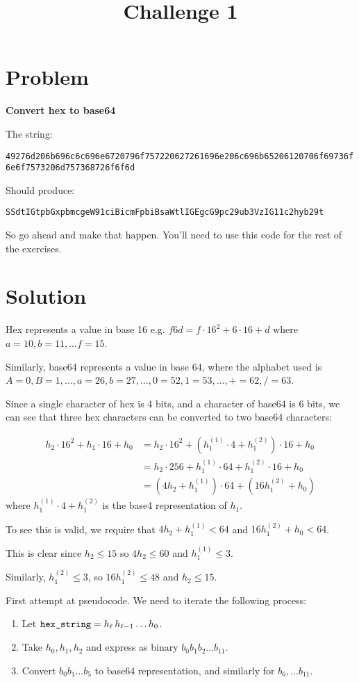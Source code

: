 \documentclass[a4paper,10pt]{article}
\begin{document}
\title{Challenge 1}
\date{}

\maketitle

\section{Problem} %
\label{sec:problem}

{\bf Convert hex to base64}

The string:

\verb+49276d206b696c6c696e6720796f757220627261696e206c696b65206120706f69736f6e6f7573206d757368726f6f6d+

Should produce:

\verb+SSdtIGtpbGxpbmcgeW91ciBicmFpbiBsaWtlIGEgcG9pc29ub3VzIG11c2hyb29t+

So go ahead and make that happen. You'll need to use this code for the rest of the exercises. 

\section{Solution} %
\label{sec:solution}

Hex represents a value in base 16 e.g. $f6d = f\cdot16^2 + 6\cdot16 + d$
where $a=10, b=11, ... f=15$.

Similarly, base64 represents a value in base 64, where the alphabet used
is $A=0, B=1, \dots, a=26, b=27, \dots, 0=52, 1=53, \dots, + = 62, / = 63$.

Since a single character of hex is 4 bits, and a character of base64 is 6 bits, 
we can see that three hex characters can be converted to two base64 characters:

\begin{align*}
 h_2 \cdot 16^2 + h_1 \cdot 16 + h_0 &= h_2 \cdot 16^2 + (h_1^{(1)}\cdot 4 + h_1^{(2)})\cdot 16 + h_0 \\
&= h_2 \cdot 256 + h_1^{(1)} \cdot 64 + h_1^{(2)}\cdot 16 + h_0 \\
&= (4h_2 + h_1^{(1)})\cdot64 + (16 h_1^{(2)} + h_0)
\end{align*}
where $h_1^{(1)}\cdot 4 + h_1^{(2)}$ is the base4 representation of $h_1$.

To see this is valid, we require that $4h_2 + h_1^{(1)} < 64$ and 
$16 h_1^{(2)} + h_0 < 64$.

This is clear since $h_2 \leq 15$ so $4h_2 \leq 60$ and $ h_1^{(1)} \leq 3$.

Similarly, $h_1^{(2)} \leq 3$, so $16 h_1^{(2)} \leq 48$ and $h_2 \leq 15$.

First attempt at pseudocode. We need to iterate the following process:
\begin{enumerate}
    \item Let $\verb+hex_string+ = h_{\ell}\,h_{\ell-1}\dots h_0$.
    \item Take $h_0, h_1, h_2$ and express as binary $b_0 b_1 b_2 \dots b_{11}$.
    \item Convert $b_0b_1 \dots b_5$ to base64 representation, and similarly
    for $b_6, \dots b_{11}.$
\end{enumerate}
\end{document}
